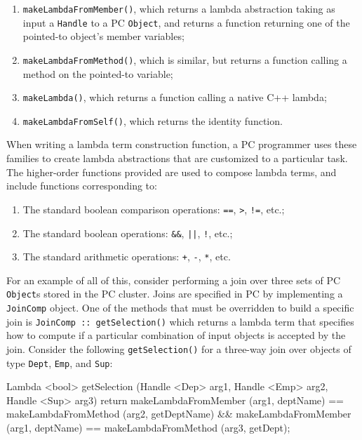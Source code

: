 \begin{enumerate}

\item \texttt{makeLambdaFromMember()}, which returns 
a lambda abstraction taking as input a \texttt{Handle} to a PC \texttt{Object}, and returns a function returning one of the pointed-to object's member variables;

\item 
\texttt{makeLambdaFromMethod()}, which is similar, but returns a function calling a method on the pointed-to variable;

\item \texttt{makeLambda()}, which returns a function calling
a native C++ lambda;

\item \texttt{makeLambdaFromSelf()}, which returns the identity function.

\end{enumerate}

\noindent
When writing a lambda term construction function, a PC programmer uses these families to create lambda abstractions that
are customized to a particular task.
The higher-order functions provided are used to compose lambda terms, and
include functions corresponding to:

\begin{enumerate}
\item
The standard boolean comparison operations: \texttt{==}, \texttt{>}, \texttt{!=}, etc.;

\item
The standard boolean
operations: \texttt{\&\&}, \texttt{||}, \texttt{!}, etc.;

\item
The standard arithmetic operations: \texttt{+}, \texttt{-}, \texttt{*}, etc.  
\end{enumerate}

For an example of all of this, consider performing a join over three
sets of PC \texttt{Object}s stored in the PC cluster.  
Joins are specified in PC 
by implementing a \texttt{JoinComp} object. One of the methods that must be overridden to build a specific join is \texttt{JoinComp :: getSelection()}
which returns a lambda term
that specifies how to compute if a particular combination of input objects is accepted by the join.  Consider the following
\texttt{getSelection()} for a three-way join over objects of type \texttt{Dept}, \texttt{Emp}, and \texttt{Sup}:


\begin{codesmall} 
Lambda <bool> getSelection (Handle <Dep> arg1, 
    Handle <Emp> arg2, Handle <Sup> arg3) {
	return makeLambdaFromMember (arg1, deptName) == 
	       makeLambdaFromMethod (arg2, getDeptName) &&
	       makeLambdaFromMember (arg1, deptName) == 
               makeLambdaFromMethod (arg3, getDept);   }
\end{codesmall}

